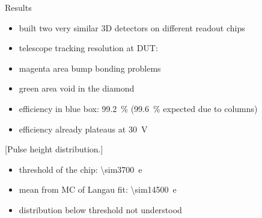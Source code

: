 \begin{block}{Results}
	
	\begin{itemize}
		\item built two very similar 3D detectors on different readout chips
	\end{itemize}

	\small{
		}\normalsize
	
	
	\begin{itemize}
		\item telescope tracking resolution at DUT: 
		\item magenta area \ra bump bonding problems
		\item green area \ra void in the diamond
		\item efficiency in blue box: \SI{99.2}{\%} (\ra \SI{99.6}{\%} expected due to columns)
		\item efficiency already plateaus at \SI{30}{\volt}
	\end{itemize}
	
	[Pulse height distribution.]\vspace*{-2ex}
	
	\begin{itemize}
		\item threshold of the chip: \SI{\sim3700}{e}
		\item mean from MC of Langau fit: \SI{\sim14500}{e}
		\item distribution below threshold not understood 
	\end{itemize}
	
\end{block}
